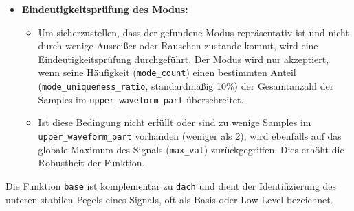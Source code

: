 \documentclass[a4paper, portrait, 12pt]{scrartcl} %
\begin{document}
\begin{itemize}
    \item \textbf{Eindeutigkeitsprüfung des Modus:}
    \begin{itemize}
        \item Um sicherzustellen, dass der gefundene Modus repräsentativ ist und nicht durch wenige Ausreißer oder Rauschen zustande kommt, wird eine Eindeutigkeitsprüfung durchgeführt. Der Modus wird nur akzeptiert, wenn seine Häufigkeit (\texttt{mode\_count}) einen bestimmten Anteil (\texttt{mode\_uniqueness\_ratio}, standardmäßig 10\%) der Gesamtanzahl der Samples im \texttt{upper\_waveform\_part} überschreitet.
        \item Ist diese Bedingung nicht erfüllt oder sind zu wenige Samples im \texttt{upper\_waveform\_part} vorhanden (weniger als 2), wird ebenfalls auf das globale Maximum des Signals (\texttt{max\_val}) zurückgegriffen. Dies erhöht die Robustheit der Funktion.
    \end{itemize}
\end{itemize}


Die Funktion \texttt{base} ist komplementär zu \texttt{dach} und dient der Identifizierung des unteren stabilen Pegels eines Signals, oft als Basis oder Low-Level bezeichnet.
\end{document}
